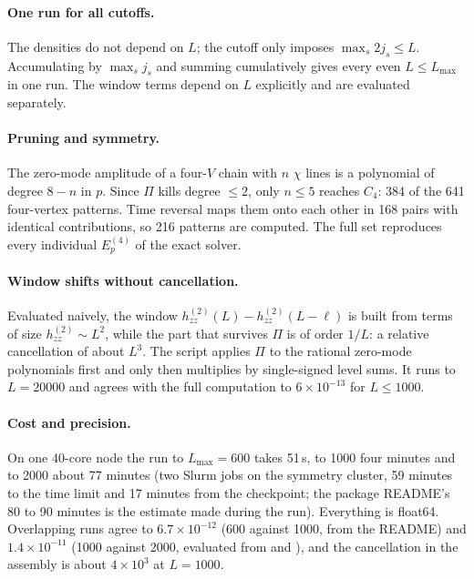 \paragraph{One run for all cutoffs.} The densities do not depend on $L$; the cutoff only imposes $\max_s2j_s\le L$.
Accumulating by $\max_sj_s$ and summing cumulatively gives every even $L\le L_{\max}$ in one run. The window terms
depend on $L$ explicitly and are evaluated separately.

\paragraph{Pruning and symmetry.} The zero-mode amplitude of a four-$V$ chain with $n$ $\chi$ lines is a polynomial of
degree $8-n$ in $p$. Since $\Pi$ kills degree $\le2$, only $n\le5$ reaches $C_4$: 384 of the 641 four-vertex patterns.
Time reversal maps them onto each other in 168 pairs with identical contributions, so 216 patterns are computed. The full set reproduces every
individual $E_p^{(4)}$ of the exact solver.

\paragraph{Window shifts without cancellation.} Evaluated naively, the window $h^{(2)}_{zz}(L)-h^{(2)}_{zz}(L-\ell)$ is built from
terms of size $h^{(2)}_{zz}\sim L^2$, while the part that survives $\Pi$ is of order $1/L$: a relative cancellation of about
$L^3$. The script  applies $\Pi$ to the
rational zero-mode polynomials first and only then multiplies by single-signed level sums. It runs to $L=20000$ and agrees
with the full computation to $6\times10^{-13}$ for $L\le1000$.

\paragraph{Cost and precision.} On one 40-core node the run to $L_{\max}=600$ takes 51\,s, to 1000 four minutes and to
2000 about 77 minutes (two Slurm jobs on the symmetry cluster, 59 minutes to the time limit and 17 minutes from the
checkpoint; the package README's 80 to 90 minutes is the estimate made during the run). Everything is float64. Overlapping
runs agree to $6.7\times10^{-12}$ (600 against 1000, from the README) and $1.4\times10^{-11}$ (1000 against 2000, evaluated
from  and ), and the cancellation in the assembly is about $4\times10^3$ at $L=1000$.

